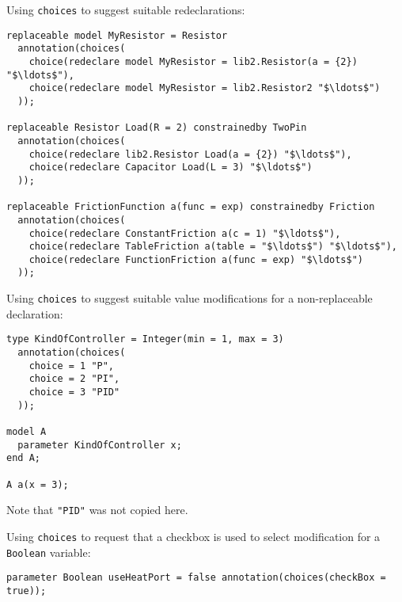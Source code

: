 \begin{example}
Using \lstinline!choices! to suggest suitable redeclarations:
\begin{lstlisting}[language=modelica]
replaceable model MyResistor = Resistor
  annotation(choices(
    choice(redeclare model MyResistor = lib2.Resistor(a = {2}) "$\ldots$"),
    choice(redeclare model MyResistor = lib2.Resistor2 "$\ldots$")
  ));

replaceable Resistor Load(R = 2) constrainedby TwoPin
  annotation(choices(
    choice(redeclare lib2.Resistor Load(a = {2}) "$\ldots$"),
    choice(redeclare Capacitor Load(L = 3) "$\ldots$")
  ));

replaceable FrictionFunction a(func = exp) constrainedby Friction
  annotation(choices(
    choice(redeclare ConstantFriction a(c = 1) "$\ldots$"),
    choice(redeclare TableFriction a(table = "$\ldots$") "$\ldots$"),
    choice(redeclare FunctionFriction a(func = exp) "$\ldots$")
  ));
\end{lstlisting}
\end{example}

\begin{example}
Using \lstinline!choices! to suggest suitable value modifications for a non-replaceable declaration:
\begin{lstlisting}[language=modelica]
type KindOfController = Integer(min = 1, max = 3)
  annotation(choices(
    choice = 1 "P",
    choice = 2 "PI",
    choice = 3 "PID"
  ));

model A
  parameter KindOfController x;
end A;

A a(x = 3);
\end{lstlisting}
Note that \lstinline!"PID"! was not copied here.
\end{example}

\begin{example}
Using \lstinline!choices! to request that a checkbox is used to select modification for a \lstinline!Boolean! variable:
\begin{lstlisting}[language=modelica]
parameter Boolean useHeatPort = false annotation(choices(checkBox = true));
\end{lstlisting}
\end{example}

